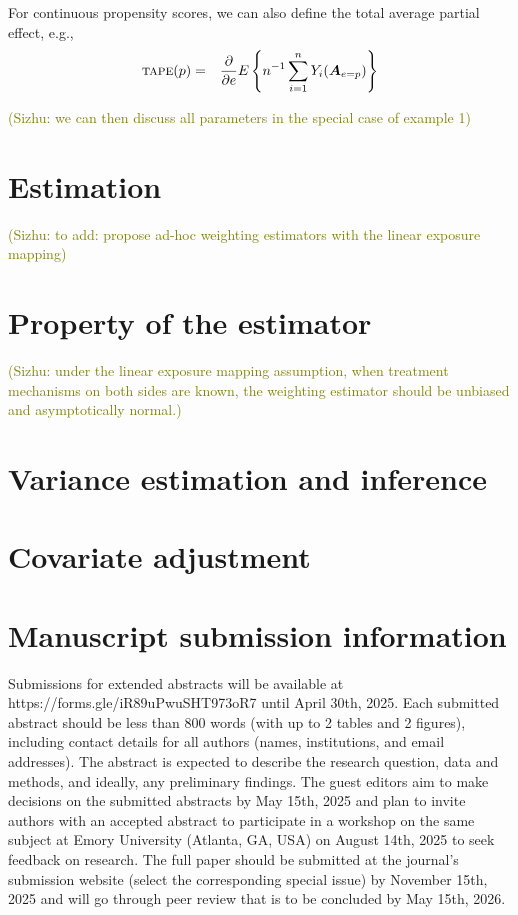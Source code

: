 \documentclass{article}
\newcommand{\bA}{\boldsymbol{A}}
\newcommand{\sumi}{\sum_{i=1}^n}
\newcommand{\sz}[1]{{\textcolor{olive}{(Sizhu: #1)}}}
\begin{document}
For continuous propensity scores, we can also define the total average partial effect, e.g.,
\begin{eqnarray*}
    \textsc{tape}(p) &=& \frac{\partial}{\partial e} E\left\{n^{-1}\sumi Y_i(\bA_{e=p})\right\}
\end{eqnarray*}

\sz{we can then discuss all parameters in the special case of example 1}


\section{Estimation}
\sz{to add: propose ad-hoc weighting estimators with the linear exposure mapping}

\section{Property of the estimator}
\sz{under the linear exposure mapping assumption, when treatment mechanisms on both sides are known, the weighting estimator should be unbiased and asymptotically normal.}

\section{Variance estimation and inference}

\section{Covariate adjustment}


\section*{Manuscript submission information}

Submissions for extended abstracts will be available at https://forms.gle/iR89uPwuSHT973oR7 until April 30th, 2025. Each submitted abstract should be less than 800 words (with up to 2 tables and 2 figures), including contact details for all authors (names, institutions, and email addresses). The abstract is expected to describe the research question, data and methods, and ideally, any preliminary findings. The guest editors aim to make decisions on the submitted abstracts by May 15th, 2025 and plan to invite authors with an accepted abstract to participate in a workshop on the same subject at Emory University (Atlanta, GA, USA) on August 14th, 2025 to seek feedback on research. The full paper should be submitted at the journal’s submission website (select the corresponding special issue) by November 15th, 2025 and will go through peer review that is to be concluded by May 15th, 2026.




\end{document}
